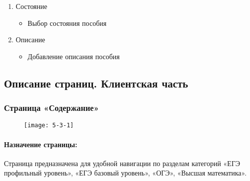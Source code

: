 \begin{enumerate}
\begin{enumerate}
\begin{enumerate}
			\item Состояние
			\begin{itemize}
				\item Выбор состояния пособия
			\end{itemize}

			\item Описание
			\begin{itemize}
				\item Добавление описания пособия
			\end{itemize}

		\end{enumerate}
	\end{enumerate}
\end{enumerate}


\subsection{Описание страниц. Клиентская часть}

\subsubsection{Страница «Содержание»}
\begin{figure}[H]
	\texttt{[image: 5-3-1]}
\end{figure}

\paragraph{Назначение страницы:} Страница предназначена для удобной навигации по разделам категорий «ЕГЭ профильный уровень», «ЕГЭ базовый уровень», «ОГЭ», «Высшая математика».


